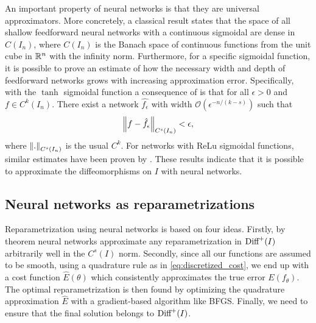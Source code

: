 An important property of neural networks is that they are universal approximators. More concretely, a classical result \cite[Theorem 2]{cybenko1989} states that the space of all shallow feedforward neural networks with a continuous sigmoidal are dense in \(C(I_n)\), where \(C(I_n)\) is the Banach space of continuous functions from the unit cube in \(\mathbb{R}^n\) with the infinity norm.  Furthermore, for a specific sigmoidal function, it is possible to prove an estimate of how the necessary width and depth of feedforward networks grows with increasing approximation error. Specifically, with the \(\tanh\) sigmoidal function a consequence of \cite[Theorem 5.1]{ryck2021} is that for all \(\epsilon > 0 \) and \(f \in C^k(I_n)\). There exist a network \(\hat{f_\epsilon}\) with width \(\mathcal{O}(\epsilon^{- n / (k-s)})\) such that
\begin{equation*}
  \norm{f - \hat{f_\epsilon}}_{C^s(I_n)} < \epsilon, 
\end{equation*} 
where \(\norm{.}_{C^s(I_n)}\) is the usual \(C^k\). For networks with ReLu sigmoidal functions, similar estimates have been proven by \citeauthor{yarotsky2017} \cite{yarotsky2017}.  These results indicate that it is possible to approximate the diffeomorphisms on \(I\) with neural networks.


\subsection{Neural networks as reparametrizations}\label{subsec:neural-nets}
Reparametrization using neural networks is based on four ideas. Firstly, by theorem \cite[Theorem 5.1]{ryck2021} neural networks approximate any reparametrization in \(\text{Diff}^+(I)\) arbitrarily well in the \(C^s(I)\) norm.  Secondly, since all our functions are assumed to be smooth, using a quadrature rule as in \eqref{eq:discretized_cost}, we end up with a cost function \(\hat E(\theta)\) which consistently approximates the true error \(E(f_\theta)\). The optimal reparametrization is then found by optimizing the quadrature approximation \(\hat E\) with a gradient-based algorithm like BFGS. Finally, we need to ensure that the final solution belongs to \(\text{Diff}^+(I)\).

